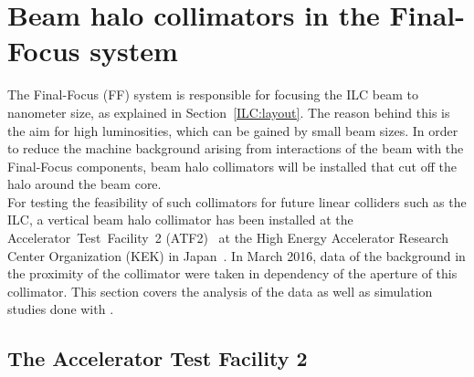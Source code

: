 \section{Beam halo collimators in the Final-Focus system}

The Final-Focus (FF) system is responsible for focusing the ILC beam to nanometer size, as explained in Section~\ref{ILC:layout}. 
The reason behind this is the aim  for high luminosities, which can be gained by small beam sizes.
In order to reduce the machine background arising from interactions of the beam with the Final-Focus components, beam halo collimators will be installed that cut off the halo around the beam core. 
\\For testing the feasibility of such collimators for future linear colliders such as the ILC, a vertical beam halo collimator has been installed at the \mbox{Accelerator Test Facility 2} (ATF2)~\cite{ATF} at the High Energy Accelerator Research Center Organization (KEK) in Japan~\cite{Nuria_Thesis}. 
In March 2016, data of the background in the proximity of the collimator were taken in dependency of the aperture of this collimator. 
This section covers the analysis of the data as well as simulation studies done with \bdsim.

\subsection{The Accelerator Test Facility 2}
\label{ATF2}

